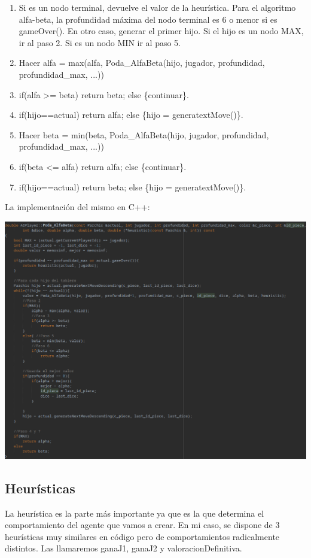\documentclass[12pt, spanish]{article}
\begin{document}
\begin{enumerate}
 \item Si es un nodo terminal, devuelve el valor de la heurística. Para el algoritmo alfa-beta, la profundidad máxima del nodo terminal es 6 o menor si es gameOver(). En otro caso, generar el primer hijo. Si el hijo es un nodo MAX, ir al paso 2. Si es un nodo MIN ir al paso 5.
 \item Hacer alfa = max(alfa, Poda\_AlfaBeta(hijo, jugador, profundidad, profundidad\_max, ...))
 \item if(alfa >= beta) return beta; else \{continuar\}.
 \item if(hijo==actual) return alfa; else \{hijo = generatextMove()\}.
 \item Hacer beta = min(beta, Poda\_AlfaBeta(hijo, jugador, profundidad, profundidad\_max, ...))
 \item if(beta <= alfa) return alfa; else \{continuar\}.
 \item if(hijo==actual) return beta; else \{hijo = generatextMove()\}.
\end{enumerate}

La implementación del mismo en C++:

\begin{centering}\includegraphics[scale = 0.6]{podaAlfaBeta.png}\\[1.0 cm]\end{centering}

\subsection{Heurísticas}
La heurística es la parte más importante ya que es la que determina el comportamiento del agente que vamos a crear. En mi caso, se dispone de 3 heurísticas muy similares en código pero de comportamientos radicalmente distintos. Las llamaremos ganaJ1, ganaJ2 y valoracionDefinitiva.
\end{document}
